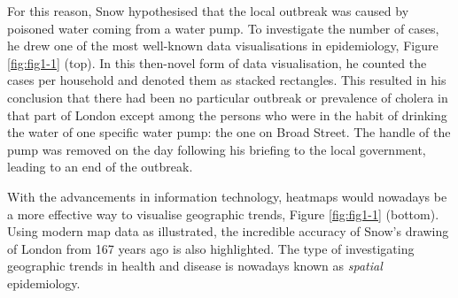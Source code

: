 \documentclass[
]{book}
\begin{document}
For this reason, Snow hypothesised that the local outbreak was caused by poisoned water coming from a water pump. To investigate the number of cases, he drew one of the most well-known data visualisations in epidemiology, Figure \ref{fig:fig1-1} (top). In this then-novel form of data visualisation, he counted the cases per household and denoted them as stacked rectangles. This resulted in his conclusion that there had been no particular outbreak or prevalence of cholera in that part of London except among the persons who were in the habit of drinking the water of one specific water pump: the one on Broad Street. The handle of the pump was removed on the day following his briefing to the local government, leading to an end of the outbreak.

With the advancements in information technology, heatmaps would nowadays be a more effective way to visualise geographic trends, Figure \ref{fig:fig1-1} (bottom). Using modern map data as illustrated, the incredible accuracy of Snow's drawing of London from 167 years ago is also highlighted. The type of investigating geographic trends in health and disease is nowadays known as \emph{spatial} epidemiology.
\end{document}
